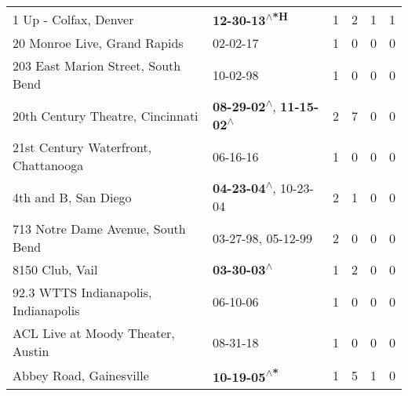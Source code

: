 \begin{supertabular}{p{0.4\textwidth}p{0.3\textwidth}p{0.05\textwidth}p{0.05\textwidth}p{0.05\textwidth}p{0.05\textwidth}}
                                                        1 Up - Colfax, Denver &                                               \textbf{12-30-13\textsuperscript{$\wedge$*H}} &  1 &  2 &  1 &  1 \\
                                                 20 Monroe Live, Grand Rapids &                                                                  02-02-17\textsuperscript{} &  1 &  0 &  0 &  0 \\
                                           203 East Marion Street, South Bend &                                                                  10-02-98\textsuperscript{} &  1 &  0 &  0 &  0 \\
                                             20th Century Theatre, Cincinnati &    \textbf{08-29-02\textsuperscript{$\wedge$}}, \textbf{11-15-02\textsuperscript{$\wedge$}} &  2 &  7 &  0 &  0 \\
                                         21st Century Waterfront, Chattanooga &                                                                  06-16-16\textsuperscript{} &  1 &  0 &  0 &  0 \\
                                                         4th and B, San Diego &                     \textbf{04-23-04\textsuperscript{$\wedge$}}, 10-23-04\textsuperscript{} &  2 &  1 &  0 &  0 \\
                                            713 Notre Dame Avenue, South Bend &                                      03-27-98\textsuperscript{}, 05-12-99\textsuperscript{} &  2 &  0 &  0 &  0 \\
                                                              8150 Club, Vail &                                                 \textbf{03-30-03\textsuperscript{$\wedge$}} &  1 &  2 &  0 &  0 \\
                                         92.3 WTTS Indianapolis, Indianapolis &                                                                  06-10-06\textsuperscript{} &  1 &  0 &  0 &  0 \\
                                            ACL Live at Moody Theater, Austin &                                                                  08-31-18\textsuperscript{} &  1 &  0 &  0 &  0 \\
                                                      Abbey Road, Gainesville &                                                \textbf{10-19-05\textsuperscript{$\wedge$*}} &  1 &  5 &  1 &  0 \\

\end{supertabular}
